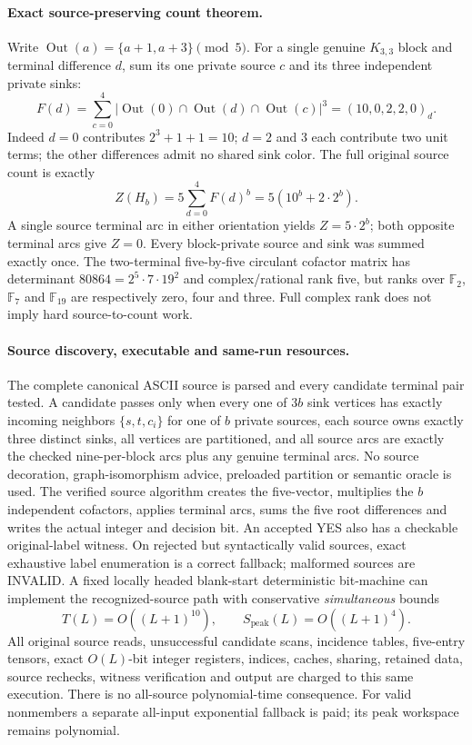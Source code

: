 \documentclass[11pt]{article}
\begin{document}
\paragraph{Exact source-preserving count theorem.}
Write $\operatorname{Out}(a)=\{a+1,a+3\}\pmod5$.
For a single genuine $K_{3,3}$ block and terminal
difference $d$, sum its one private source $c$ and its
three independent private sinks:
\[
 F(d)=\sum_{c=0}^{4}
 \left|\operatorname{Out}(0)\cap\operatorname{Out}(d)
                       \cap\operatorname{Out}(c)\right|^3
       =(10,0,2,2,0)_d.
\]
Indeed $d=0$ contributes $2^3+1+1=10$;
$d=2$ and $3$ each contribute two unit terms; the other
differences admit no shared sink color. The full original
source count is exactly
\[
 \boxed{Z(H_b)=5\sum_{d=0}^{4}F(d)^b
       =5(10^b+2\cdot2^b).}
\]
A single source terminal arc in either orientation yields
$Z=5\cdot2^b$; both opposite terminal arcs give $Z=0$.
Every block-private source and sink was summed exactly once.
The two-terminal five-by-five circulant cofactor matrix has
determinant $80864=2^5\cdot7\cdot19^2$ and complex/rational
rank five, but ranks over $\mathbb F_2$, $\mathbb F_7$ and
$\mathbb F_{19}$ are respectively zero, four and three.
Full complex rank does not imply hard source-to-count work.

\paragraph{Source discovery, executable and same-run resources.}
The complete canonical ASCII source is parsed and every
candidate terminal pair tested. A candidate passes only
when every one of $3b$ sink vertices has exactly incoming
neighbors $\{s,t,c_i\}$ for one of $b$ private sources,
each source owns exactly three distinct sinks, all vertices
are partitioned, and all source arcs are exactly the checked
nine-per-block arcs plus any genuine terminal arcs.
No source decoration, graph-isomorphism advice, preloaded
partition or semantic oracle is used. The verified source
algorithm creates the five-vector, multiplies the $b$ independent
cofactors, applies terminal arcs, sums the five root differences
and writes the actual integer and decision bit. An accepted
YES also has a checkable original-label witness.
On rejected but syntactically valid sources, exact exhaustive
label enumeration is a correct fallback; malformed sources
are INVALID. A fixed locally headed blank-start deterministic
bit-machine can implement the recognized-source path with
conservative \emph{simultaneous} bounds
\[
 T(L)=O((L+1)^{10}),\qquad
 S_{\mathrm{peak}}(L)=O((L+1)^4).
\]
All original source reads, unsuccessful candidate scans,
incidence tables, five-entry tensors, exact $O(L)$-bit
integer registers, indices, caches, sharing, retained data,
source rechecks, witness verification and output are charged
to this same execution. There is no all-source polynomial-time
consequence. For valid nonmembers a separate all-input
exponential fallback is paid; its peak workspace remains
polynomial.
\end{document}
